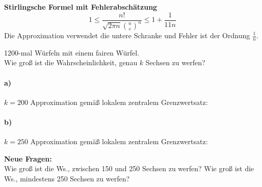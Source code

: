 \begin{erg}
    \textbf{Stirlingsche Formel mit Fehlerabschätzung} 
    \begin{equation}
        1 \leq \frac{n!}{\sqrt{2 \pi n} \binom{n}{e}^n} \leq 1 + \frac{1}{11n}\label{eq:equation}
    \end{equation}
    Die Approximation verwendet die untere Schranke und Fehler ist der Ordnung $\frac{1}{n}$.
\end{erg}
\begin{bsp}
    1200-mal Würfeln mit einem fairen Würfel.  \\
    Wie groß ist die Wahrscheinlichkeit, genau $k$ Sechsen zu werfen?

    \paragraph{a)} $k = 200$
    Approximation gemäß lokalem zentralem Grenzwertsatz:
    \mab{0.030901\dots}

    \paragraph{b)} $k = 250$
    Approximation gemäß lokalem zentralem Grenzwertsatz:
    \mab{0.0000170\dots}
\end{bsp}
\textbf{Neue Fragen:}  \\
Wie groß ist die Ws., zwischen 150 und 250 Sechsen zu werfen?
Wie groß ist die Ws., mindestens 250 Sechsen zu werfen?

